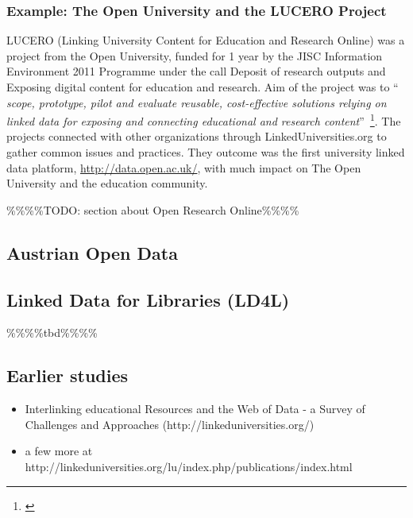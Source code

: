 \subsubsection{Example: The Open University and the LUCERO Project}
LUCERO (Linking University Content for Education and Research Online) was a project from the Open University, funded for 1 year by the JISC Information Environment 2011 Programme under the call Deposit of research outputs and Exposing digital content for education and research. Aim of the project was to "` \textit{ scope, prototype, pilot and evaluate reusable, cost-effective solutions relying on linked data for exposing and connecting educational and research content}"'~\footnote{\citet{url:lucero}}. The projects connected with other organizations through LinkedUniversities.org to gather common issues and practices. They outcome was the first university linked data platform, \url{http://data.open.ac.uk/}, with much impact on The Open University and the education community.

\%\%\%\%TODO: section about Open Research Online\%\%\%\%

\subsection{Austrian Open Data}
\subsection{Linked Data for Libraries (LD4L)\label{ld-libraries}}

\%\%\%\%tbd\%\%\%\%

\subsection{Earlier studies}
\begin{itemize}
	\item Interlinking educational Resources and the Web of Data - a Survey of Challenges and Approaches (http://linkeduniversities.org/)
	\item a few more at http://linkeduniversities.org/lu/index.php/publications/index.html
	
	
\end{itemize}